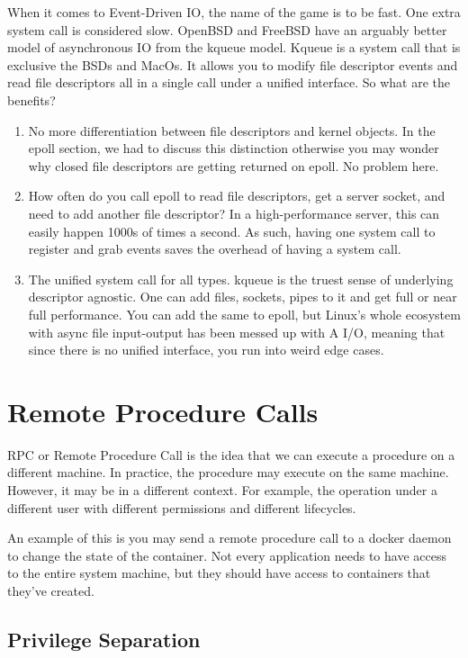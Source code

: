 When it comes to Event-Driven IO, the name of the game is to be fast.
One extra system call is considered slow.
OpenBSD and FreeBSD have an arguably better model of asynchronous IO from the kqueue model.
Kqueue is a system call that is exclusive the BSDs and MacOs.
It allows you to modify file descriptor events and read file descriptors all in a single call under a unified interface.
So what are the benefits?

\begin{enumerate}
\item No more differentiation between file descriptors and kernel objects. In the epoll section, we had to discuss this distinction otherwise you may wonder why closed file descriptors are getting returned on epoll. No problem here.
\item How often do you call epoll to read file descriptors, get a server socket, and need to add another file descriptor?
  In a high-performance server, this can easily happen 1000s of times a second.
  As such, having one system call to register and grab events saves the overhead of having a system call.
\item The unified system call for all types.
  kqueue is the truest sense of underlying descriptor agnostic.
  One can add files, sockets, pipes to it and get full or near full performance.
  You can add the same to epoll, but Linux's whole ecosystem with async file input-output has been messed up with A I/O, meaning that since there is no unified interface, you run into weird edge cases.
\end{enumerate}


\section{Remote Procedure Calls}

RPC or Remote Procedure Call is the idea that we can execute a procedure on a different machine.
In practice, the procedure may execute on the same machine.
However, it may be in a different context.
For example, the operation under a different user with different permissions and different lifecycles.

An example of this is you may send a remote procedure call to a docker daemon to change the state of the container.
Not every application needs to have access to the entire system machine, but they should have access to containers that they've created.

\subsection{Privilege Separation}

